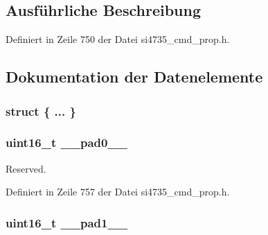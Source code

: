 \subsection{Ausführliche Beschreibung}


Definiert in Zeile 750 der Datei si4735\+\_\+cmd\+\_\+prop.\+h.



\subsection{Dokumentation der Datenelemente}
\hypertarget{unionfm__rds__int__source_aaa2b4fd6cdb719f59cdc0d138099572c}{}\subsubsection[{"@91}]{\setlength{\rightskip}{0pt plus 5cm}struct \{ ... \} }\label{unionfm__rds__int__source_aaa2b4fd6cdb719f59cdc0d138099572c}
\hypertarget{unionfm__rds__int__source_a77132c2c26a75f5b8751b235cda23828}{}
\subsubsection[{\+\_\+\+\_\+pad0\+\_\+\+\_\+}]{\setlength{\rightskip}{0pt plus 5cm}uint16\+\_\+t \+\_\+\+\_\+pad0\+\_\+\+\_\+}\label{unionfm__rds__int__source_a77132c2c26a75f5b8751b235cda23828}


Reserved. 



Definiert in Zeile 757 der Datei si4735\+\_\+cmd\+\_\+prop.\+h.

\hypertarget{unionfm__rds__int__source_ab72e3a1f2f7db8695c60c658f5a0f11a}{}
\subsubsection[{\+\_\+\+\_\+pad1\+\_\+\+\_\+}]{\setlength{\rightskip}{0pt plus 5cm}uint16\+\_\+t \+\_\+\+\_\+pad1\+\_\+\+\_\+}\label{unionfm__rds__int__source_ab72e3a1f2f7db8695c60c658f5a0f11a}


